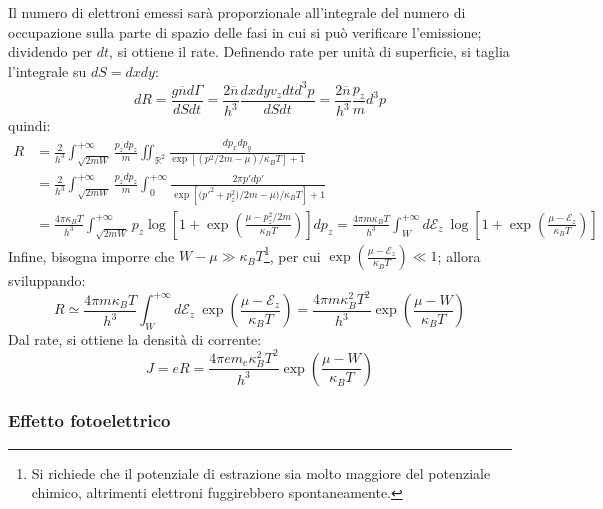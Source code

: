 \documentclass[10pt, a4paper]{scrartcl}
\numberwithin{equation}{subsection}
\theoremstyle{style1}
\theoremstyle{style2}
\begin{document}
Il numero di elettroni emessi sar\`a proporzionale all'integrale del numero di occupazione sulla parte di spazio delle fasi in cui si pu\`o verificare l'emissione;
dividendo per $dt$, si ottiene il rate.
Definendo rate per unit\`a di superficie, si taglia l'integrale su $dS = dxdy$:
\begin{equation*}
			dR = \frac{g \overline{n} d\Gamma}{dS dt} = \frac{2 \overline{n}}{h^3} \frac{dxdy v_z dt d^3 p}{dS dt}= \frac{2\overline{n}}{h^3}\frac{p_z }{m} d^3p
\end{equation*}
quindi:
\begin{equation*}
  			\begin{split}
			 R &= \frac{2}{h^3} \int_{\sqrt{2m W} } ^{+\infty} \frac{p_z dp_z}{m} \iint_{\mathbb{R}^2}  \frac{dp_x dp_y}{\exp \left[ (p^2 / 2m - \mu ) / \kappa _ B T \right] + 1} \\
					      &= \frac{2}{h^3} \int_{\sqrt{2m W} } ^{+\infty} \frac{p_z dp_z}{m} \int_{0} ^{+\infty} \frac{2\pi p ' dp'}{\exp \left[ \big(p'^2 + p_z^2)/ 2m - \mu \big) / \kappa _ B T \right] + 1} \\
					      &= \frac{4\pi \kappa _B T }{h^3}\int_{\sqrt{2mW} } ^{+\infty} p_z\log \left[ 1+ \exp\left(\frac{\mu  - p_z^2 / 2m}{\kappa _B T}\right)  \right] dp_z  =  \frac{4 \pi m \kappa _B T }{h^3} \int_{W} ^{+\infty} d \mathscr{E}_z \ \log \left[ 1+ \exp \left(\frac{\mu - \mathscr{E}_z}{\kappa _B T}\right)  \right] 
			\end{split}
\end{equation*}
Infine, bisogna imporre che $W - \mu  \gg \kappa _B T$\footnote{Si richiede che il potenziale di estrazione sia molto maggiore del potenziale chimico, altrimenti elettroni fuggirebbero spontaneamente.}, per cui $\exp\left(\frac{\mu  - \mathscr{E}_z}{\kappa _B T}\right) \ll 1$; allora sviluppando:
\begin{equation}
	R \simeq \frac{4\pi m \kappa _B T }{h^3}\int_{W} ^{+\infty} d \mathscr{E}_z\ \exp\left( \frac{\mu  - \mathscr{E}_z}{\kappa _B T}\right) = \frac{4\pi m \kappa _B ^2 T^2}{h^3} \exp \left(\frac{\mu  - W}{\kappa _B T}\right) 
\end{equation}
Dal rate, si ottiene la densit\`a di corrente:
\begin{equation}
	J = eR = \frac{4 \pi e m_e \kappa _B ^2 T^2}{h^3} \exp \left(\frac{\mu  - W}{\kappa _B T}\right) 
\end{equation}
\subsubsection{Effetto fotoelettrico}
\end{document}
